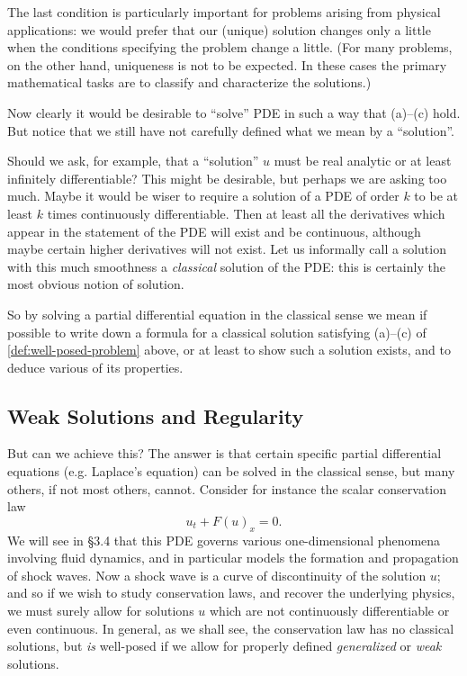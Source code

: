 The last condition is particularly important for problems arising from physical applications: we would prefer that our (unique) solution changes only a little when the conditions specifying the problem change a little. (For many problems, on the other hand, uniqueness is not to be expected. In these cases the primary mathematical tasks are to classify and characterize the solutions.)

Now clearly it would be desirable to ``solve'' PDE in such a way that (a)--(c) hold. But notice that we still have not carefully defined what we mean by a ``solution''.

\begin{definition}
\label{def:classical-solution}
\leanok
Should we ask, for example, that a ``solution'' $u$ must be real analytic or at least infinitely differentiable? This might be desirable, but perhaps we are asking too much. Maybe it would be wiser to require a solution of a PDE of order $k$ to be at least $k$ times continuously differentiable. Then at least all the derivatives which appear in the statement of the PDE will exist and be continuous, although maybe certain higher derivatives will not exist. Let us informally call a solution with this much smoothness a \textit{classical} solution of the PDE: this is certainly the most obvious notion of solution.
\end{definition}

So by solving a partial differential equation in the classical sense we mean if possible to write down a formula for a classical solution satisfying (a)--(c) of \cref{def:well-posed-problem} above, or at least to show such a solution exists, and to deduce various of its properties.

\subsection{Weak Solutions and Regularity}
\label{sec:weak-solutions-regularity}

But can we achieve this? The answer is that certain specific partial differential equations (e.g. Laplace's equation) can be solved in the classical sense, but many others, if not most others, cannot. Consider for instance the scalar conservation law
$$u_t + F(u)_x = 0.$$
We will see in \S 3.4 that this PDE governs various one-dimensional phenomena involving fluid dynamics, and in particular models the formation and propagation of shock waves. Now a shock wave is a curve of discontinuity of the solution $u$; and so if we wish to study conservation laws, and recover the underlying physics, we must surely allow for solutions $u$ which are not continuously differentiable or even continuous. In general, as we shall see, the conservation law has no classical solutions, but \textit{is} well-posed if we allow for properly defined \textit{generalized} or \textit{weak} solutions.

